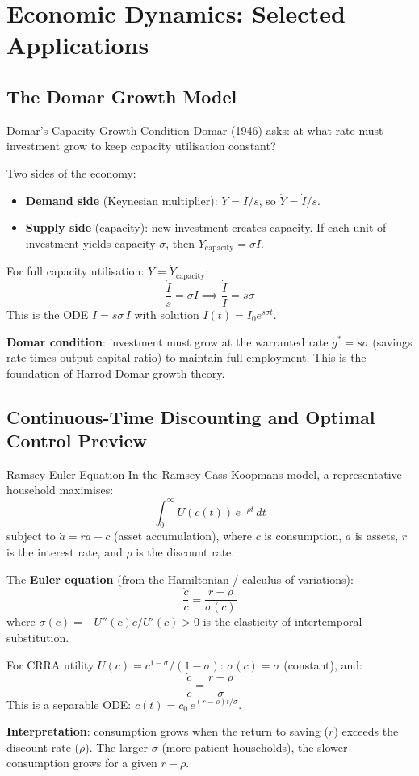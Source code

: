 \documentclass[12pt, a4paper]{article}
\theoremstyle{definition}
\newcommand{\dd}[1]{\,d#1}
\begin{document}
\section{Economic Dynamics: Selected Applications}

\subsection{The Domar Growth Model}

\begin{exbox}{Domar's Capacity Growth Condition}
Domar (1946) asks: at what rate must investment grow to keep capacity
utilisation constant?

Two sides of the economy:
\begin{itemize}
  \item \textbf{Demand side} (Keynesian multiplier): $Y = I/s$, so
        $\dot Y = \dot I/s$.
  \item \textbf{Supply side} (capacity): new investment creates capacity.
        If each unit of investment yields capacity $\sigma$, then
        $\dot Y_{\text{capacity}} = \sigma I$.
\end{itemize}

For full capacity utilisation: $\dot Y = \dot Y_{\text{capacity}}$:
\[
  \frac{\dot I}{s} = \sigma I \implies \frac{\dot I}{I} = s\sigma
\]
This is the ODE $\dot I = s\sigma\,I$ with solution $I(t) = I_0 e^{s\sigma t}$.

\textbf{Domar condition}: investment must grow at the warranted rate
$g^* = s\sigma$ (savings rate times output-capital ratio) to maintain full
employment. This is the foundation of Harrod-Domar growth theory.
\end{exbox}

\subsection{Continuous-Time Discounting and Optimal Control Preview}

\begin{exbox}{Ramsey Euler Equation}
In the Ramsey-Cass-Koopmans model, a representative household maximises:
\[
  \int_0^\infty U(c(t))\,e^{-\rho t}\dd{t}
\]
subject to $\dot a = ra - c$ (asset accumulation), where $c$ is consumption,
$a$ is assets, $r$ is the interest rate, and $\rho$ is the discount rate.

The \textbf{Euler equation} (from the Hamiltonian / calculus of variations):
\[
  \frac{\dot c}{c} = \frac{r - \rho}{\sigma(c)}
\]
where $\sigma(c) = -U''(c)c/U'(c) > 0$ is the elasticity of intertemporal
substitution.

For CRRA utility $U(c) = c^{1-\sigma}/(1-\sigma)$:
$\sigma(c) = \sigma$ (constant), and:
\[
  \frac{\dot c}{c} = \frac{r-\rho}{\sigma}
\]
This is a separable ODE: $c(t) = c_0\,e^{(r-\rho)t/\sigma}$.

\textbf{Interpretation}: consumption grows when the return to saving ($r$)
exceeds the discount rate ($\rho$). The larger $\sigma$ (more patient
households), the slower consumption grows for a given $r-\rho$.
\end{exbox}
\end{document}
